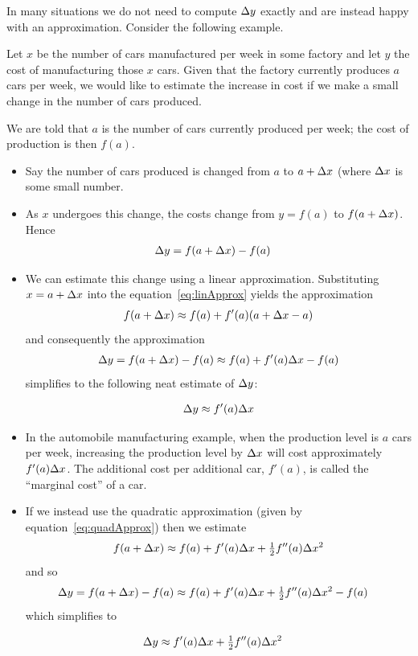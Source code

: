 In many situations we do not need to compute $\Delta y$ exactly and are instead happy with
an approximation. Consider the following example.
\begin{eg}\label{eg_3_4_4}
Let $x$ be the number of cars manufactured per week in some factory and let $y$ the cost
of manufacturing those $x$ cars. Given that the factory currently produces $a$ cars per
week, we would like to estimate the increase in cost if we make a small change in the
number of cars produced.

\soln We are told that $a$ is the number of cars currently produced per week; the cost
of production  is then $f(a)$.
\begin{itemize}
 \item Say the number of cars produced is changed from $a$ to $a+\Delta x$ (where $\Delta x$
is some small number.
\item As $x$ undergoes this change, the costs change from $y=f(a)$ to $f(a+\Delta x)$.
Hence
\begin{align*}
  \Delta y &= f(a+\Delta x) - f(a)
\end{align*}
\item We can estimate this change using a linear approximation. Substituting
$x=a+\Delta x$ into the equation~\eqref{eq:linApprox} yields the approximation
\begin{align*}
f(a+\Delta x)\approx f(a)+f'(a)(a+\Delta x-a)
\end{align*}
and consequently the approximation
\begin{align*}
\Delta y=f(a+\Delta x)-f(a)\approx f(a)+f'(a)\Delta x-f(a)
\end{align*}
simplifies to the following neat estimate of $\Delta y$:
\begin{impeqn}\label{eq:lineDe}
\begin{align*}
    \Delta y\approx f'(a)\Delta x
\end{align*}
\end{impeqn}
\item In the automobile manufacturing example, when the production level is $a$ cars per
week, increasing the production level by $\Delta x$ will cost approximately
$f'(a)\Delta x$. The additional cost per additional car, $f'(a)$,  is called the ``marginal
cost'' of a car.

\item If we instead use the quadratic approximation (given by
equation~\eqref{eq:quadApprox}) then we estimate
\begin{align*}
f(a+\Delta x)\approx f(a)+f'(a)\Delta x+\tfrac{1}{2} f''(a)\Delta x^2
\end{align*}
and so
\begin{align*}
\Delta y&=f(a+\Delta x)-f(a) \approx f(a)+f'(a)\Delta x +\tfrac{1}{2} f''(a)\Delta x^2-f(a)
\end{align*}
which simplifies to
\begin{impeqn}\label{eq:quadDe}
\begin{align*}
  \Delta y &\approx f'(a)\Delta x+\tfrac{1}{2} f''(a)\Delta x^2
\end{align*}
\end{impeqn}
\end{itemize}

\end{eg}

